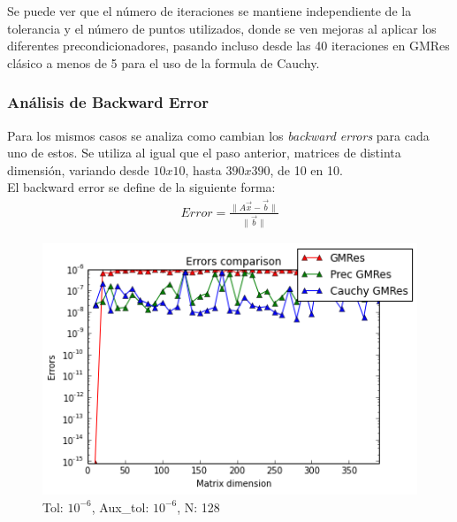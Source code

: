 \documentclass[fleqn]{article}
\begin{document}
Se puede ver que el número de iteraciones se mantiene independiente de la tolerancia y el número de puntos utilizados, donde se ven mejoras al aplicar los diferentes precondicionadores, pasando incluso desde las 40 iteraciones en GMRes clásico a menos de 5 para el uso de la formula de Cauchy.

\subsubsection*{Análisis de Backward Error}
Para los mismos casos se analiza como cambian los \emph{backward errors} para cada uno de estos.
Se utiliza al igual que el paso anterior, matrices de distinta dimensión, variando desde $10x10$, hasta $390x390$, de 10 en 10.\\
El backward error se define de la siguiente forma:
\begin{align}
    Error =  \frac{\|A\vec{x}-\vec{b}\|}{\|\vec{b}\|}
\end{align}

\begin{figure}[ht]
    \centering
    \includegraphics[scale=0.4]{images/b1.png}
    \caption{Tol: $10^{-6}$, Aux\_tol: $10^{-6}$, N: 128}
    \label{fig:7}
\end{figure}
\end{document}
